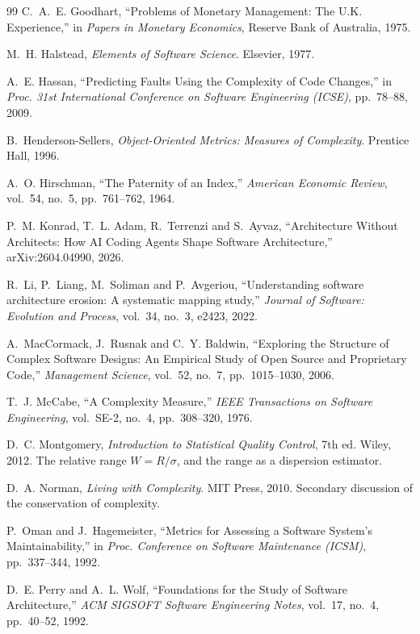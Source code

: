 \documentclass[11pt,a4paper]{article}
\begin{document}
\begin{thebibliography}{99}
 C.~A.~E. Goodhart,
  ``Problems of Monetary Management: The U.K. Experience,''
  in \emph{Papers in Monetary Economics}, Reserve Bank of Australia, 1975.

 M.~H. Halstead,
  \emph{Elements of Software Science}. Elsevier, 1977.

 A.~E. Hassan,
  ``Predicting Faults Using the Complexity of Code Changes,''
  in \emph{Proc. 31st International Conference on Software Engineering (ICSE)},
  pp.~78--88, 2009.

 B.~Henderson-Sellers,
  \emph{Object-Oriented Metrics: Measures of Complexity}. Prentice Hall, 1996.

 A.~O. Hirschman,
  ``The Paternity of an Index,''
  \emph{American Economic Review}, vol.~54, no.~5, pp.~761--762, 1964.

 P.~M. Konrad, T.~L. Adam, R.~Terrenzi and S.~Ayvaz,
  ``Architecture Without Architects: How AI Coding Agents Shape Software
  Architecture,'' arXiv:2604.04990, 2026.

 R.~Li, P.~Liang, M.~Soliman and P.~Avgeriou,
  ``Understanding software architecture erosion: A systematic mapping study,''
  \emph{Journal of Software: Evolution and Process}, vol.~34, no.~3, e2423,
  2022.

 A.~MacCormack, J.~Rusnak and C.~Y. Baldwin,
  ``Exploring the Structure of Complex Software Designs: An Empirical Study of
  Open Source and Proprietary Code,''
  \emph{Management Science}, vol.~52, no.~7, pp.~1015--1030, 2006.

 T.~J. McCabe,
  ``A Complexity Measure,''
  \emph{IEEE Transactions on Software Engineering}, vol.~SE-2, no.~4,
  pp.~308--320, 1976.

 D.~C. Montgomery,
  \emph{Introduction to Statistical Quality Control}, 7th ed. Wiley, 2012.
  The relative range $W = R/\sigma$, and the range as a dispersion estimator.

 D.~A. Norman,
  \emph{Living with Complexity}. MIT Press, 2010.
  Secondary discussion of the conservation of complexity.

 P.~Oman and J.~Hagemeister,
  ``Metrics for Assessing a Software System's Maintainability,''
  in \emph{Proc. Conference on Software Maintenance (ICSM)}, pp.~337--344, 1992.

 D.~E. Perry and A.~L. Wolf,
  ``Foundations for the Study of Software Architecture,''
  \emph{ACM SIGSOFT Software Engineering Notes}, vol.~17, no.~4, pp.~40--52,
  1992.


\end{thebibliography}
\end{document}
